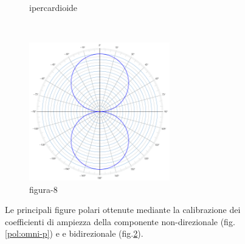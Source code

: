 \begin{figure}[h]
\begin{subfigure}[t]{0.48\textwidth}
        \caption{ipercardioide}%
        \label{pol:iper-p}
    \end{subfigure}
    ~
    \begin{subfigure}[t]{0.48\textwidth}
        \centering
        \includegraphics[height=6cm]{CAPITOLI/_TIKZ/POLAR/fig8}
        \caption{figura-8}%
        \label{pol:fig8-p}
    \end{subfigure}
    \caption{Le principali figure polari ottenute mediante la calibrazione dei
    coefficienti di ampiezza della componente non-direzionale (fig. \ref{pol:omni-p}) e
    e bidirezionale (fig.\ref{pol:fig8-p}).}
    \label{pol:princicpali}
\end{figure}
